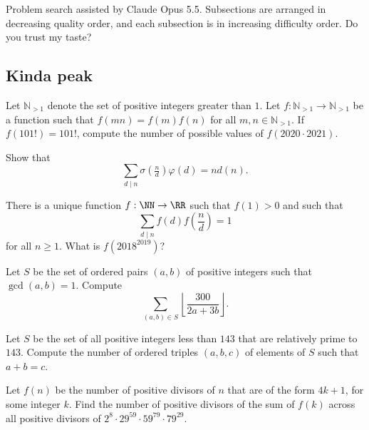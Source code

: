 \documentclass[11pt]{scrartcl}
\begin{document}
Problem search assisted by Claude Opus 5.5. Subsections are arranged in decreasing quality order, and each subsection is in increasing difficulty order. Do you trust my taste?

\subsection{Kinda peak}

\begin{problem} %
    Let $\mathbb{N}_{>1}$ denote the set of positive integers greater than $1$. Let $f\colon \mathbb{N}_{>1} \to \mathbb{N}_{>1}$ be a function such that $f(mn) = f(m)f(n)$ for all $m, n \in \mathbb{N}_{>1}$. If $f(101!) = 101!$, compute the number of possible values of $f(2020 \cdot 2021)$.
\end{problem}

\begin{problem}[Brilliant]
	\label{pro:brilliant}
	Show that
	\[\sum_{d \mid n}\sigma(\tfrac nd)\varphi(d) = nd(n).\]
\end{problem}

\begin{problem} %
    There is a unique function $f: \NN \to \RR$ such that $f(1) > 0$ and such that
    \[\sum_{d \mid n} f(d)f\left(\frac nd\right) = 1\]
    for all $n \ge 1$. What is $f(2018^{2019})$?
\end{problem}

\begin{problem} %
    Let $S$ be the set of ordered pairs $(a, b)$ of positive integers such that $\gcd(a, b) = 1$. Compute
    \[\sum_{(a, b) \in S} \left\lfloor \frac{300}{2a + 3b} \right\rfloor.\]
\end{problem}

\begin{problem} %
    Let $S$ be the set of all positive integers less than $143$ that are relatively prime to $143$. Compute the number of ordered triples $(a, b, c)$ of elements of $S$ such that $a + b = c$.
\end{problem}

\begin{problem}[SMT 2024/T14]
	\label{pro:smt-2024}
	Let $f(n)$ be the number of positive divisors of $n$ that are of the form $4k +1$, for some integer $k$. Find the number of positive divisors of the sum of $f(k)$ across all positive divisors of $2^8 \cdot 29^{59} \cdot 59^{79} \cdot 79^{29}$.
\end{problem}
\end{document}
